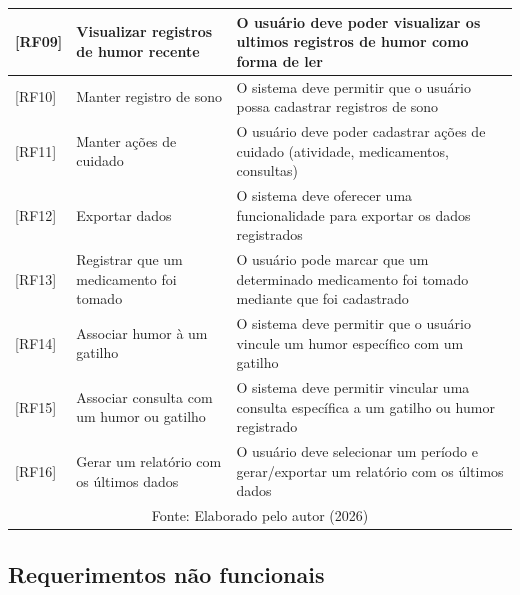 \begin{longtable}{| p{} | p{} | p{} |}
        \hline

        [RF09] &
        Visualizar registros de humor recente &
        O usuário deve poder visualizar os ultimos registros de humor como
        forma de ler \\

        \hline

        [RF10] &
        Manter registro de sono &
        O sistema deve permitir que o usuário possa cadastrar registros de sono \\

        \hline

        [RF11] &
        Manter ações de cuidado &
        O usuário deve poder cadastrar ações de cuidado (atividade, medicamentos, consultas) \\

        \hline

        [RF12] &
        Exportar dados &
        O sistema deve oferecer uma funcionalidade para exportar os dados
        registrados \\

        \hline

        [RF13] &
        Registrar que um medicamento foi tomado &
        O usuário pode marcar que um determinado medicamento foi tomado
        mediante que foi cadastrado \\

        \hline

        [RF14] &
        Associar humor à um gatilho &
        O sistema deve permitir que o usuário vincule um humor específico com
        um gatilho \\

        \hline

        [RF15] &
        Associar consulta com um humor ou gatilho &
        O sistema deve permitir vincular uma consulta específica a um
        gatilho ou humor registrado \\

        \hline

        [RF16] &
        Gerar um relatório com os últimos dados &
        O usuário deve selecionar um período e gerar/exportar um relatório com
        os últimos dados  \\

        \hline
        \multicolumn{3}{c}{\small Fonte: Elaborado pelo autor (2026)} \\
\end{longtable}

\subsection{Requerimentos não funcionais}

